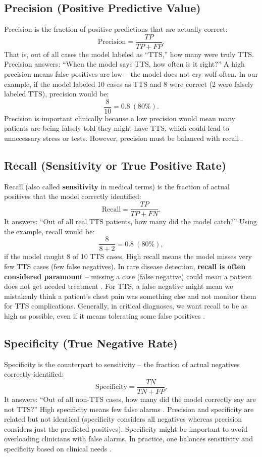 \documentclass[12pt, BSc]{muthesis}
\begin{document}
\subsection{Precision (Positive Predictive Value)}
Precision is the fraction of positive predictions that are actually correct:
\[
\text{Precision} = \frac{TP}{TP + FP}.
\]
That is, out of all cases the model labeled as ``TTS,'' how many were truly TTS. Precision answers: ``When the model says TTS, how often is it right?'' A high precision means false positives are low – the model does not cry wolf often. In our example, if the model labeled 10 cases as TTS and 8 were correct (2 were falsely labeled TTS), precision would be:
\[
\frac{8}{10} = 0.8 \ (80\%).
\]
Precision is important clinically because a low precision would mean many patients are being falsely told they might have TTS, which could lead to unnecessary stress or tests. However, precision must be balanced with recall \cite{Powers2011}.

\subsection{Recall (Sensitivity or True Positive Rate)}
Recall (also called \textbf{sensitivity} in medical terms) is the fraction of actual positives that the model correctly identified:
\[
\text{Recall} = \frac{TP}{TP + FN}.
\]
It answers: ``Out of all real TTS patients, how many did the model catch?'' Using the example, recall would be:
\[
\frac{8}{8 + 2} = 0.8 \ (80\%),
\]
if the model caught 8 of 10 TTS cases. High recall means the model misses very few TTS cases (few false negatives). In rare disease detection, \textbf{recall is often considered paramount} – missing a case (false negative) could mean a patient does not get needed treatment \cite{Altman1994, Shimizu2022}. For TTS, a false negative might mean we mistakenly think a patient’s chest pain was something else and not monitor them for TTS complications. Generally, in critical diagnoses, we want recall to be as high as possible, even if it means tolerating some false positives \cite{Laumer2022}.

\subsection{Specificity (True Negative Rate)}
Specificity is the counterpart to sensitivity – the fraction of actual negatives correctly identified:
\[
\text{Specificity} = \frac{TN}{TN + FP}.
\]
It answers: ``Out of all non-TTS cases, how many did the model correctly say are not TTS?'' High specificity means few false alarms \cite{Akobeng2007}. Precision and specificity are related but not identical (specificity considers all negatives whereas precision considers just the predicted positives). Specificity might be important to avoid overloading clinicians with false alarms. In practice, one balances sensitivity and specificity based on clinical needs \cite{Zweig1993}.
\end{document}
